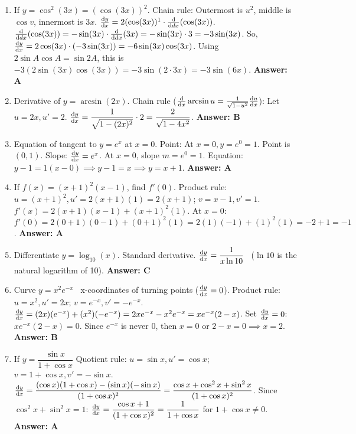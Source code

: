 \begin{enumerate}[label={\arabic*.}]
  \item If \(y = \cos^2(3x) = (\cos(3x))^2\).
    Chain rule: Outermost is \(u^2\), middle is \(\cos v\), innermost is \(3x\).
    \(\frac{\mathrm{d}y}{\mathrm{d}x} = 2(\cos(3x))^1 \cdot \frac{\mathrm{d}}{\mathrm{d}dx}(\cos(3x))\).
    \(\frac{\mathrm{d}}{\mathrm{d}dx}(\cos(3x)) = -\sin(3x) \cdot \frac{\mathrm{d}}{\mathrm{d}dx}(3x) = -\sin(3x) \cdot 3 = -3\sin(3x)\).
    So, \(\frac{\mathrm{d}y}{\mathrm{d}x} = 2\cos(3x) \cdot (-3\sin(3x)) = -6\sin(3x)\cos(3x)\).
    Using \(2\sin A \cos A = \sin 2A\), this is \(-3(2\sin(3x)\cos(3x)) = -3\sin(2 \cdot 3x) = -3\sin(6x)\).
    \textbf{Answer: A}

  \item Derivative of \(y = \arcsin(2x)\).
    Chain rule (\(\frac{\mathrm{d}}{\mathrm{d}x}\arcsin u = \frac{1}{\sqrt{1-u^2}}\frac{\mathrm{d}u}{\mathrm{d}x}\)): Let \(u=2x, u'=2\).
    \(\frac{\mathrm{d}y}{\mathrm{d}x} = \dfrac{1}{\sqrt{1-(2x)^2}} \cdot 2 = \dfrac{2}{\sqrt{1-4x^2}}\).
    \textbf{Answer: B}

  \item Equation of tangent to \(y=e^x\) at \(x=0\).
    Point: At \(x=0, y=e^0=1\). Point is \((0,1)\).
    Slope: \(\frac{\mathrm{d}y}{\mathrm{d}x} = e^x\). At \(x=0\), slope \(m=e^0=1\).
    Equation: \(y-1 = 1(x-0) \implies y-1=x \implies y=x+1\).
    \textbf{Answer: A}

  \item If \(f(x) = (x+1)^2(x-1)\), find \(f'(0)\).
    Product rule: \(u=(x+1)^2, u'=2(x+1)(1)=2(x+1)\); \(v=x-1, v'=1\).
    \(f'(x) = 2(x+1)(x-1) + (x+1)^2(1)\).
    At \(x=0\): \(f'(0) = 2(0+1)(0-1) + (0+1)^2(1) = 2(1)(-1) + (1)^2(1) = -2 + 1 = -1\).
    \textbf{Answer: A}

  \item Differentiate \(y = \log_{10}(x)\). Standard derivative.
    \(\frac{\mathrm{d}y}{\mathrm{d}x} = \dfrac{1}{x \ln 10}\) \ (\(\ln 10\) is the natural logarithm of 10).
    \textbf{Answer: C}

  \item Curve \(y = x^2 e^{-x}\) \ x-coordinates of turning points (\(\frac{\mathrm{d}y}{\mathrm{d}x}=0\)).
    Product rule: \(u=x^2, u'=2x\); \(v=e^{-x}, v'=-e^{-x}\).
    \(\frac{\mathrm{d}y}{\mathrm{d}x} = (2x)(e^{-x}) + (x^2)(-e^{-x}) = 2xe^{-x} - x^2e^{-x} = xe^{-x}(2-x)\).
    Set \(\frac{\mathrm{d}y}{\mathrm{d}x}=0\): \(xe^{-x}(2-x)=0\).
    Since \(e^{-x}\) is never 0, then \(x=0\) or \(2-x=0 \implies x=2\).
    \textbf{Answer: B}

  \item If \(y = \dfrac{\sin x}{1+\cos x}\)
    Quotient rule: \(u=\sin x, u'=\cos x\); \(v=1+\cos x, v'=-\sin x\).
    \(\frac{\mathrm{d}y}{\mathrm{d}x} = \dfrac{(\cos x)(1+\cos x) - (\sin x)(-\sin x)}{(1+\cos x)^2} = \dfrac{\cos x + \cos^2 x + \sin^2 x}{(1+\cos x)^2}\).
    Since \(\cos^2 x + \sin^2 x = 1\):
    \(\frac{\mathrm{d}y}{\mathrm{d}x} = \dfrac{\cos x + 1}{(1+\cos x)^2} = \dfrac{1}{1+\cos x}\) for \(1+\cos x \neq 0\).
    \textbf{Answer: A}


\end{enumerate}
